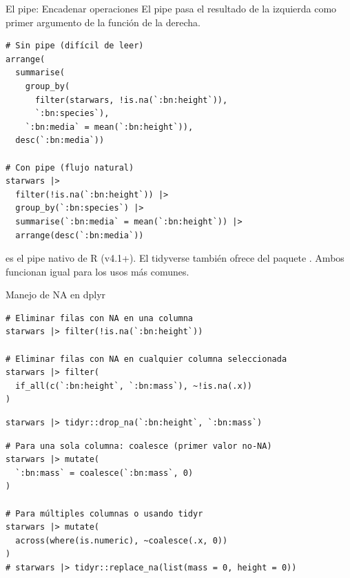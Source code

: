 \documentclass[8pt]{beamer}
\begin{document}
\begin{frame}[fragile]{El pipe: Encadenar operaciones}
	El pipe \rscript{|>} pasa el resultado de la izquierda como primer argumento de la función de la derecha.
\begin{lstlisting}[style=RScript]
# Sin pipe (difícil de leer)
arrange(
  summarise(
    group_by(
      filter(starwars, !is.na(`:bn:height`)),
      `:bn:species`),
    `:bn:media` = mean(`:bn:height`)),
  desc(`:bn:media`))

# Con pipe (flujo natural)
starwars |>
  filter(!is.na(`:bn:height`)) |>
  group_by(`:bn:species`) |>
  summarise(`:bn:media` = mean(`:bn:height`)) |>
  arrange(desc(`:bn:media`))
\end{lstlisting}

	\begin{alertblock}{}
		\rscript{|>} es el pipe nativo de R (v4.1+). El tidyverse también ofrece \rscript{\%>\%} del paquete . Ambos funcionan igual para los usos más comunes.
	\end{alertblock}
\end{frame}





\begin{frame}[fragile]{Manejo de NA en dplyr}
\begin{lstlisting}[style=RScript]
# Eliminar filas con NA en una columna
starwars |> filter(!is.na(`:bn:height`))

# Eliminar filas con NA en cualquier columna seleccionada
starwars |> filter(
  if_all(c(`:bn:height`, `:bn:mass`), ~!is.na(.x))
)
\end{lstlisting}

\begin{lstlisting}[style=RScript]
starwars |> tidyr::drop_na(`:bn:height`, `:bn:mass`)
\end{lstlisting}

\begin{lstlisting}[style=RScript]
# Para una sola columna: coalesce (primer valor no-NA)
starwars |> mutate(
  `:bn:mass` = coalesce(`:bn:mass`, 0)
)

# Para múltiples columnas o usando tidyr
starwars |> mutate(
  across(where(is.numeric), ~coalesce(.x, 0))
)
# starwars |> tidyr::replace_na(list(mass = 0, height = 0))
\end{lstlisting}
\end{frame}
\end{document}
